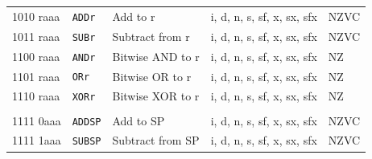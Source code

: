 \documentclass[10pt,fleqn]{book}
\begin{document}
\begin{tabular}{ l l l l l }
1010 raaa   & \verb|ADDr|    & Add to r                                    & i, d, n, s, sf, x, sx, sfx  & NZVC \\
1011 raaa   & \verb|SUBr|    & Subtract from r                             & i, d, n, s, sf, x, sx, sfx  & NZVC \\
1100 raaa   & \verb|ANDr|    & Bitwise AND to r                            & i, d, n, s, sf, x, sx, sfx  & NZ \\
1101 raaa   & \verb|ORr|     & Bitwise OR to r                             & i, d, n, s, sf, x, sx, sfx  & NZ \\
1110 raaa   & \verb|XORr|    & Bitwise XOR to r                            & i, d, n, s, sf, x, sx, sfx  & NZ \\
 \\
1111 0aaa   & \verb|ADDSP|   & Add to SP                                   & i, d, n, s, sf, x, sx, sfx  & NZVC \\
1111 1aaa   & \verb|SUBSP|   & Subtract from SP                            & i, d, n, s, sf, x, sx, sfx  & NZVC \\
\bottomrule
\end{tabular}

\newpage

\end{document}
